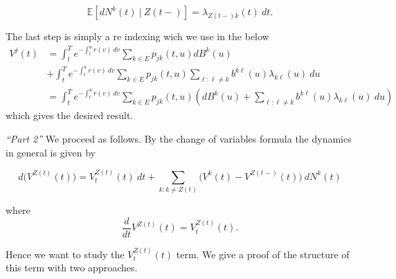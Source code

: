 \documentclass[a4paper,12pt,openany]{book}
\begin{document}
\[
\mathbb E[dN^k(t) \ \vert\ Z(t-)]=\lambda_{Z(t-)k}(t)\ dt.
\]

The last step is simply a re indexing wich we use in the below
\begin{align*}
V^j(t)&=\int_t^Te^{-\int_t^ur(v)\ dv}\sum_{k\in E}p_{jk}(t,u)d B^k(u)\\
&+\int_t^Te^{-\int_t^ur(v)\ dv}\sum_{k\in E}p_{jk}(t,u)\sum_{\ell :\ell \ne k}  b^{k\ell }(u)\lambda_{k\ell }(u)\ du\\
&=\int_t^Te^{-\int_t^ur(v)\ dv}\sum_{k\in E}p_{jk}(t,u)\left(d B^k(u)+\sum_{\ell :\ell \ne k}  b^{k\ell }(u)\lambda_{k\ell }(u)\ du\right)
\end{align*}
which gives the desired result.

\emph{``Part 2''} We proceed as follows. By the change of variables formula the dynamics in general is given by

\[
d\Big(V^{Z(t)}(t)\Big)=V_t^{Z(t)}(t)\ dt+\sum_{k: k\ne Z(t)}\Big(V^k(t)-V^{Z(t-)}(t)\Big)\ dN^k(t)
\]

where
\[
\frac{d}{dt}V^{Z(t)}(t)=V_t^{Z(t)}(t).
\]

Hence we want to study the \(V_t^{Z(t)}(t)\) term. We give a proof of the structure of this term with two approaches.
\end{document}
